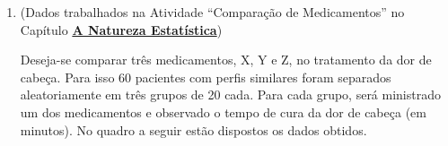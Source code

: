 {{{\begin{enumerate}
Considere as afirmações a seguir.
\begin{enumerate}
\item {} 
A média das notas transformadas é 500.

\item {} 
O desvio padrão das notas transformadas é 100.

\item {} 
Se a distribuição de notas é aproximadamente simétrica e com poucas notas atípicas, cerca de 67\% dos candidatos obtiveram notas transformadas entre 400 e 600.

\item {} 
Se a distribuição de notas é aproximadamente simétrica e com poucas notas atípicas, cerca de 95\% dos candidatos obtiveram notas transformadas entre 300 e 700.

\end{enumerate}

Responda se concorda ou não com cada uma destas afirmações, justificando cada resposta.

\item (Dados trabalhados na Atividade “Comparação de Medicamentos”{} no Capítulo \textbf{\hyperref[est1-chap]{A Natureza Estatística}})

Deseja-se comparar três medicamentos, X, Y e Z, no tratamento da dor de cabeça. Para isso 60 pacientes com perfis similares foram separados aleatoriamente em três grupos de 20 cada. Para cada grupo,  será ministrado um dos medicamentos e observado o tempo de cura da dor de cabeça (em minutos). No quadro a seguir estão dispostos os dados obtidos.


\end{enumerate}}}}
